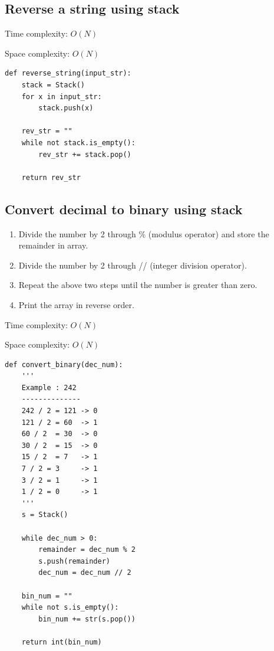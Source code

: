 \documentclass[a4paper,11pt]{book}
\begin{document}
\subsection{Reverse a string using stack}

\noindent Time complexity: $O(N)$

\noindent Space complexity: $O(N)$

\begin{lstlisting}
def reverse_string(input_str):
    stack = Stack()
    for x in input_str:
        stack.push(x)

    rev_str = ""
    while not stack.is_empty():
        rev_str += stack.pop()

    return rev_str
\end{lstlisting}

\subsection{Convert decimal to binary using stack}

\begin{enumerate}
    \item Divide the number by 2 through \% (modulus operator) and store the remainder in array.
    \item Divide the number by 2 through // (integer division operator).
    \item Repeat the above two steps until the number is greater than zero.
    \item Print the array in reverse order.
\end{enumerate}

\noindent Time complexity: $O(N)$

\noindent Space complexity: $O(N)$

\begin{lstlisting}
def convert_binary(dec_num):
    '''
    Example : 242
    --------------
    242 / 2 = 121 -> 0
    121 / 2 = 60  -> 1
    60 / 2  = 30  -> 0
    30 / 2  = 15  -> 0
    15 / 2  = 7   -> 1
    7 / 2 = 3     -> 1
    3 / 2 = 1     -> 1
    1 / 2 = 0	  -> 1
    '''
    s = Stack()

    while dec_num > 0:
        remainder = dec_num % 2
        s.push(remainder)
        dec_num = dec_num // 2

    bin_num = ""
    while not s.is_empty():
        bin_num += str(s.pop())

    return int(bin_num)
\end{lstlisting}
\end{document}
